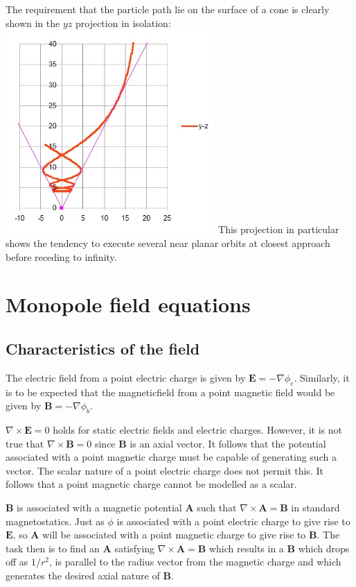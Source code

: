 \documentclass[twocolumn]{article}
\begin{document}
The requirement that the particle path lie on the surface of a cone is clearly shown in the $yz$ projection in isolation:
\includegraphics[width=80mm]{mm4.jpg}
This projection in particular shows the tendency to execute several near planar orbits at closest approach before receding to infinity.
\section{Monopole field equations}
\label{sec:Field equations}
\subsection{Characteristics of the field}
The electric field from a point electric charge is given by  $\mathbf E = -\nabla \phi_e$. Similarly, it is to be expected that the magneticfield from a point magnetic field would be given by  $\mathbf B = -\nabla \phi_b$.

\noindent
$\nabla \times \mathbf E = 0$ holds for static electric fields and electric charges. However, it is not true that $\nabla \times \mathbf B = 0$ since $\mathbf B$ is an axial vector. It follows that the potential associated with a point magnetic charge must be capable of generating such a vector. The scalar nature of a point electric charge does not permit this. It follows that a point magnetic charge cannot be modelled as a scalar.

\noindent
$\mathbf B$ is associated with a magnetic potential $\mathbf A$ such that $\nabla \times \mathbf A = \mathbf B$ in standard magnetostatics. Just as $\phi$ is associated with a point electric charge to give rise to $\mathbf E$, so $\mathbf A$ will be associated with a point magnetic charge to give rise to  $ \mathbf B$. The task then is to find an $\mathbf A$ satisfying $\nabla \times \mathbf A = \mathbf B$ which results in a $\mathbf B$ which drops off as $1/r^2$, is parallel to the radius vector from the magnetic charge and which generates the desired axial nature of $\mathbf B$.
\end{document}
